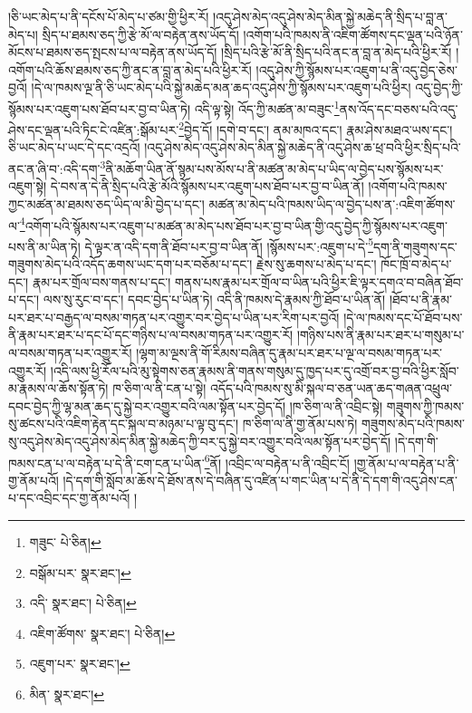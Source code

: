 །ཅི་ཡང་མེད་པ་ནི་དངོས་པོ་མེད་པ་ཙམ་གྱི་ཕྱིར་རོ། །འདུ་ཤེས་མེད་འདུ་ཤེས་མེད་མིན་སྐྱེ་མཆེད་ནི་སྲིད་པ་བླ་ན་མེད་པ། སྲིད་པ་ཐམས་ཅད་ཀྱི་རྩེ་མོ་ལ་བརྟེན་ནས་ཡོད་དོ། །འགོག་པའི་ཁམས་ནི་འཇིག་ཚོགས་དང་ལྡན་པའི་ཉོན་མོངས་པ་ཐམས་ཅད་སྤངས་པ་ལ་བརྟེན་ནས་ཡོད་དོ། །སྲིད་པའི་རྩེ་མོ་ནི་སྲིད་པའི་ནང་ན་བླ་ན་མེད་པའི་ཕྱིར་རོ། །འགོག་པའི་ཆོས་ཐམས་ཅད་ཀྱི་ནང་ན་བླ་ན་མེད་པའི་ཕྱིར་རོ། །འདུ་ཤེས་ཀྱི་སྙོམས་པར་འཇུག་པ་ནི་འདུ་བྱེད་ཅེས་བྱའོ། །དེ་ལ་ཁམས་ལྔ་ནི་ཅི་ཡང་མེད་པའི་སྐྱེ་མཆེད་མན་ཆད་འདུ་ཤེས་ཀྱི་སྙོམས་པར་འཇུག་པའི་ཕྱིར། འདུ་བྱེད་ཀྱི་སྙོམས་པར་འཇུག་པས་ཐོབ་པར་བྱ་བ་ཡིན་ཏེ། འདི་ལྟ་སྟེ། འོད་ཀྱི་མཚན་མ་བཟུང་\footnote{གཟུང་  པེ་ཅིན། }ནས་འོད་དང་བཅས་པའི་འདུ་ཤེས་དང་ལྡན་པའི་ཏིང་ངེ་འཛིན་:སྒོམ་པར་\footnote{བསྒོམ་པར་  སྣར་ཐང་། }བྱེད་དོ། །དགེ་བ་དང་། ནམ་མཁའ་དང་། རྣམ་ཤེས་མཐའ་ཡས་དང་། ཅི་ཡང་མེད་པ་ཡང་དེ་དང་འདྲའོ། །འདུ་ཤེས་མེད་འདུ་ཤེས་མེད་མིན་སྐྱེ་མཆེད་ནི་འདུ་ཤེས་ཆ་ཕྲ་བའི་ཕྱིར་སྲིད་པའི་ནང་ན་ཞི་བ་:འདི་དག་\footnote{འདི་  སྣར་ཐང་།  པེ་ཅིན། }ནི་མཆོག་ཡིན་ནོ་སྙམ་པས་མོས་པ་ནི་མཚན་མ་མེད་པ་ཡིད་ལ་བྱེད་པས་སྙོམས་པར་འཇུག་སྟེ། དེ་བས་ན་དེ་ནི་སྲིད་པའི་རྩེ་མོའི་སྙོམས་པར་འཇུག་པས་ཐོབ་པར་བྱ་བ་ཡིན་ནོ། །འགོག་པའི་ཁམས་ཀྱང་མཚན་མ་ཐམས་ཅད་ཡིད་ལ་མི་བྱེད་པ་དང་། མཚན་མ་མེད་པའི་ཁམས་ཡིད་ལ་བྱེད་པས་ན་:འཇིག་ཚོགས་ལ་\footnote{འཇིག་ཚོགས་  སྣར་ཐང་།  པེ་ཅིན། }འགོག་པའི་སྙོམས་པར་འཇུག་པ་མཚན་མ་མེད་པས་ཐོབ་པར་བྱ་བ་ཡིན་གྱི་འདུ་བྱེད་ཀྱི་སྙོམས་པར་འཇུག་པས་ནི་མ་ཡིན་ཏེ། དེ་ལྟར་ན་འདི་དག་ནི་ཐོབ་པར་བྱ་བ་ཡིན་ནོ། །སྙོམས་པར་:འཇུག་པ་དེ་\footnote{འཇུག་པར་  སྣར་ཐང་། }དག་ནི་གཟུགས་དང་གཟུགས་མེད་པའི་འདོད་ཆགས་ཡང་དག་པར་བཅོམ་པ་དང་། རྗེས་སུ་ཆགས་པ་མེད་པ་དང་། ཁོང་ཁྲོ་བ་མེད་པ་དང་། རྣམ་པར་གྲོལ་བས་གནས་པ་དང་། གནས་པས་རྣམ་པར་གྲོལ་བ་ཡིན་པའི་ཕྱིར་ཇི་ལྟར་དགའ་བ་བཞིན་ཐོབ་པ་དང་། ལས་སུ་རུང་བ་དང་། དབང་བྱེད་པ་ཡིན་ཏེ། འདི་ནི་ཁམས་དེ་རྣམས་ཀྱི་ཐོབ་པ་ཡིན་ནོ། །ཐོབ་པ་ནི་རྣམ་པར་ཐར་པ་བརྒྱད་ལ་བསམ་གཏན་པར་འགྱུར་བར་བྱེད་པ་ཡིན་པར་རིག་པར་བྱའོ། །དེ་ལ་ཁམས་དང་པོ་ཐོབ་པས་ནི་རྣམ་པར་ཐར་པ་དང་པོ་དང་གཉིས་པ་ལ་བསམ་གཏན་པར་འགྱུར་རོ། །གཉིས་པས་ནི་རྣམ་པར་ཐར་པ་གསུམ་པ་ལ་བསམ་གཏན་པར་འགྱུར་རོ། །ལྷག་མ་ལྔས་ནི་གོ་རིམས་བཞིན་དུ་རྣམ་པར་ཐར་པ་ལྔ་ལ་བསམ་གཏན་པར་འགྱུར་རོ། །འདི་ལས་ཕྱི་རོལ་པའི་མུ་སྟེགས་ཅན་རྣམས་ནི་གནས་གསུམ་དུ་ཁྱད་པར་དུ་འགྲོ་བར་བྱ་བའི་ཕྱིར་སློབ་མ་རྣམས་ལ་ཆོས་སྟོན་ཏེ། ཁ་ཅིག་ལ་ནི་ངན་པ་སྟེ། འདོད་པའི་ཁམས་སུ་མི་སྐལ་བ་ཅན་ཡན་ཆད་གཞན་འཕྲུལ་དབང་བྱེད་ཀྱི་ལྷ་མན་ཆད་དུ་སྐྱེ་བར་འགྱུར་བའི་ལམ་སྟོན་པར་བྱེད་དོ། །ཁ་ཅིག་ལ་ནི་འབྲིང་སྟེ། གཟུགས་ཀྱི་ཁམས་སུ་ཚངས་པའི་འཇིག་རྟེན་དང་སྐལ་བ་མཉམ་པ་ལྟ་བུ་དང་། ཁ་ཅིག་ལ་ནི་གྱ་ནོམ་པས་ཏེ། གཟུགས་མེད་པའི་ཁམས་སུ་འདུ་ཤེས་མེད་འདུ་ཤེས་མེད་མིན་སྐྱེ་མཆེད་ཀྱི་བར་དུ་སྐྱེ་བར་འགྱུར་བའི་ལམ་སྟོན་པར་བྱེད་དོ། །དེ་དག་གི་ཁམས་ངན་པ་ལ་བརྟེན་པ་དེ་ནི་ངག་ངན་པ་ཡིན་\footnote{མིན་  སྣར་ཐང་། }ནོ། །འབྲིང་ལ་བརྟེན་པ་ནི་འབྲིང་ངོ། །གྱ་ནོམ་པ་ལ་བརྟེན་པ་ནི་གྱ་ནོམ་པའོ། །དེ་དག་གི་སློབ་མ་ཆོས་དེ་ཐོས་ནས་དེ་བཞིན་དུ་འཛིན་པ་གང་ཡིན་པ་དེ་ནི་དེ་དག་གི་འདུ་ཤེས་ངན་པ་དང་འབྲིང་དང་གྱ་ནོམ་པའོ། །
